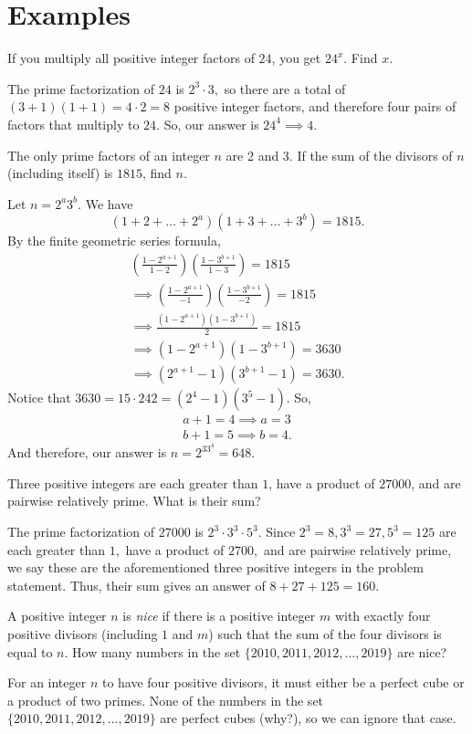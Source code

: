 \documentclass[11pt,paper=letter]{scrartcl}
\begin{document}
\section{Examples}
\begin{exboxed}
If you multiply all positive integer factors of $24$, you get $24^x$. Find $x$.
\end{exboxed}
The prime factorization of $24$ is $2^3 \cdot 3,$ so there are a total of $(3 + 1)(1 + 1) = 4 \cdot 2 = 8$ positive integer factors, and therefore four pairs of factors that multiply to $24$. So, our answer is $24^4 \implies \boxed{4}.$
\begin{exboxed}
The only prime factors of an integer $n$ are 2 and 3. If the sum of the divisors of $n$ (including itself) is $1815$, find $n$.
\end{exboxed}
Let $n=2^a3^b$. We have \[\left(1+2+\dots+2^a\right)\left(1+3+\dots+3^b\right)=1815.\] By the finite geometric series formula, 
\begin{align*}
\left(\frac{1 - 2^{a + 1}}{1 - 2}\right)\left(\frac{1 - 3^{b + 1}}{1 - 3}\right) = 1815\\
\implies \left(\frac{1 - 2^{a + 1}}{-1}\right)\left(\frac{1 - 3^{b + 1}}{-2}\right) = 1815\\
\implies \frac{(1 - 2^{a + 1})(1 - 3^{b + 1})}{2} = 1815\\
\implies \left(1 - 2^{a + 1}\right)\left(1 - 3^{b + 1}\right) = 3630\\
\implies (2^{a + 1} - 1)(3^{b + 1} - 1) = 3630.
\end{align*}
Notice that $3630 = 15 \cdot 242 = (2^4 - 1)(3^5 - 1).$ So, 
\begin{align*}
    a + 1 = 4 \implies a = 3\\
    b + 1 = 5 \implies b = 4.
\end{align*}
And therefore, our answer is $n = 2^33^4 = \boxed{648}.$
\begin{exboxed}[AMC 10B 2013/9]
Three positive integers are each greater than $1$, have a product of $ 27000 $, and are pairwise relatively prime. What is their sum?
\end{exboxed}
The prime factorization of $27000$ is $2^3 \cdot 3^3 \cdot 5^3.$ Since $2^3 = 8, 3^3 = 27, 5^3 = 125$ are each greater than $1,$ have a product of $2700,$ and are pairwise relatively prime, we say these are the aforementioned three positive integers in the problem statement. Thus, their sum gives an answer of $8 + 27 + 125 = \boxed{160}.$
\begin{exboxed}[AMC 10B 2013/24]
A positive integer $n$ is \emph{nice} if there is a positive integer $m$ with exactly four positive divisors (including $1$ and $m$) such that the sum of the four divisors is equal to $n$. How many numbers in the set $\{2010, 2011, 2012,\ldots,2019\}$ are nice?
\end{exboxed}
For an integer $n$ to have four positive divisors, it must either be a perfect cube or a product of two primes. None of the numbers in the set $\{2010, 2011, 2012, \ldots, 2019\}$ are perfect cubes (why?), so we can ignore that case. 
\end{document}
